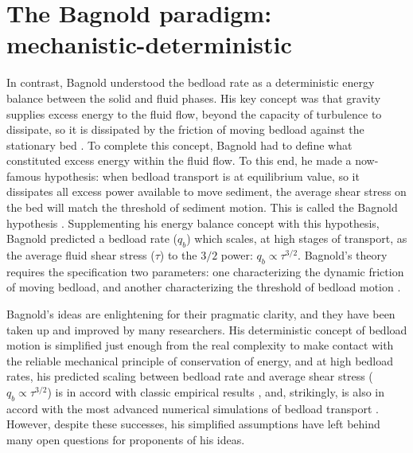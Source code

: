 \documentclass{article}
\begin{document}
\section{The Bagnold paradigm: mechanistic-deterministic} 


In contrast, Bagnold understood the bedload rate as a deterministic energy balance between the solid and fluid phases. 
His key concept was that gravity supplies excess energy to the fluid flow, beyond the capacity of turbulence to dissipate, so it is dissipated by the friction of moving bedload against the stationary bed \citep{Bagnold1956, Bagnold1966, Bagnold1973}.
To complete this concept, Bagnold had to define what constituted excess energy within the fluid flow. 
To this end, he made a now-famous hypothesis: when bedload transport is at equilibrium value, so it dissipates all excess power available to move sediment, the average shear stress on the bed will match the threshold of sediment motion.
This is called the Bagnold hypothesis \citep{Seminara2002, Ancey2006}. 
Supplementing his energy balance concept with this hypothesis, Bagnold predicted a bedload rate ($q_b$) which scales, at high stages of transport, as the average fluid shear stress ($\tau$) to the $3/2$ power: $q_b \propto \tau^{3/2}.$
Bagnold's theory requires the specification two parameters: one characterizing the dynamic friction of moving bedload, and another characterizing the threshold of bedload motion \citep{Bagnold1973}. 

Bagnold's ideas are enlightening for their pragmatic clarity, and they have been taken up and improved by many researchers. 
His deterministic concept of bedload motion is simplified just enough from the real complexity to make contact with the reliable mechanical principle of conservation of energy, and at high bedload rates, his predicted scaling between bedload rate and average shear stress ($q_b \propto \tau^{3/2}$) is in accord with classic empirical results \citep{MeyerPeter1948}, and, strikingly, is also in accord with the most advanced numerical simulations of bedload transport \citep{Schmeeckle2014}.
However, despite these successes, his simplified assumptions have left behind many open questions for proponents of his ideas. 
\end{document}

